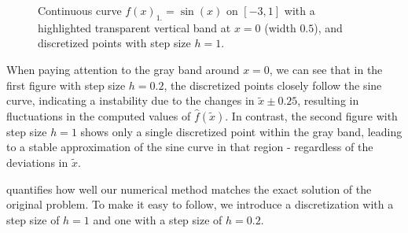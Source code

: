 \begin{figure}[h]
    \centering
    \caption{Continuous curve $f(x)_{1.} = \sin(x)$ on $[-3,1]$ with a highlighted transparent vertical band at $x=0$ (width $0.5$), and discretized points with step size $h=1$.}
    \label{fig:stability_h1}
\end{figure}

When paying attention to the gray band around $x=0$, we can see that in the first figure with step size $h=0.2$, 
the discretized points closely follow the sine curve, indicating a instability due to the changes in $\tilde{x} \pm 0.25$, resulting in fluctuations
in the computed values of $\hat{f}(\tilde{x})$.
In contrast, the second figure with step size $h=1$ shows only a single discretized point within the gray band, 
leading to a stable approximation of the sine curve in that region - regardless of the deviations in $\tilde{x}$.


 quantifies how well our numerical method matches the exact solution of the original problem. 
To make it easy to follow, we introduce a discretization with a step size of $h=1$ and one with a step size of $h=0.2$.

